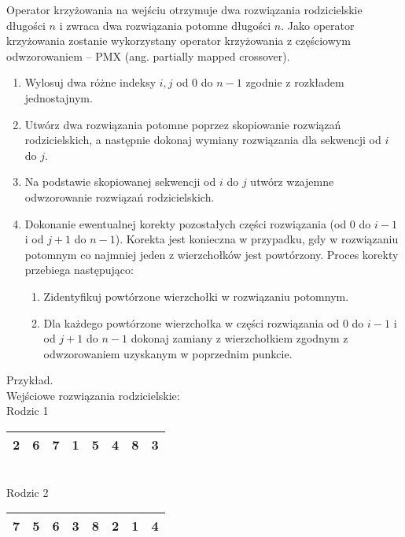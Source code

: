 \documentclass[12pt, a4paper]{article}
\begin{document}
Operator krzyżowania na wejściu otrzymuje dwa rozwiązania rodzicielskie długości $n$ i zwraca dwa rozwiązania potomne długości $n$. 
Jako operator krzyżowania zostanie wykorzystany operator krzyżowania z częściowym odwzorowaniem -- {PMX} (ang. partially mapped crossover).
\begin{enumerate}
 \item Wylosuj dwa różne indeksy $i, j$ od 0 do $n-1$ zgodnie z rozkładem jednostajnym.
 \item Utwórz dwa rozwiązania potomne poprzez skopiowanie rozwiązań rodzicielskich, a następnie dokonaj wymiany rozwiązania dla sekwencji od $i$ do $j$.
 \item Na podstawie skopiowanej sekwencji od $i$ do $j$ utwórz wzajemne odwzorowanie rozwiązań rodzicielskich.
 \item Dokonanie ewentualnej korekty pozostałych części rozwiązania (od $0$ do $i-1$ i od $j+1$ do $n-1$). Korekta jest konieczna w przypadku, gdy w rozwiązaniu potomnym co najmniej jeden z wierzchołków jest powtórzony. Proces korekty przebiega następująco:
 \begin{enumerate}
 	\item Zidentyfikuj powtórzone wierzchołki w rozwiązaniu potomnym.
 	\item Dla każdego powtórzone wierzchołka w części rozwiązania od $0$ do $i-1$ i od $j+1$ do $n-1$ dokonaj zamiany z wierzchołkiem zgodnym z odwzorowaniem uzyskanym w poprzednim punkcie.
 \end{enumerate}
\end{enumerate}

Przykład. \\

Wejściowe rozwiązania rodzicielskie: \\

Rodzic 1
\begin{tabular}{ | c | c | c | c | c | c | c | c |}
  \hline
  2 & 6 &  \cellcolor{green!25}7 & \cellcolor{green!25}1 & \cellcolor{green!25}5 & \cellcolor{green!25}4 & 8 & 3 \\ \hline
\end{tabular}\\
Rodzic 2
\begin{tabular}{ | c | c | c | c | c | c | c | c |}
  \hline
  7 & 5 & \cellcolor{blue!25}6 & \cellcolor{blue!25}3 & \cellcolor{blue!25}8 & \cellcolor{blue!25}2 & 1 & 4 \\ \hline
\end{tabular}
\end{document}
